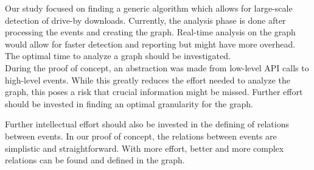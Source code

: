 Our study focused on finding a generic algorithm which allows for large-scale detection of drive-by downloads. Currently, the analysis phase is done after processing the events and creating the graph. Real-time analysis on the graph would allow for faster detection and reporting but might have more overhead. The optimal time to analyze a graph should be investigated.\\

During the proof of concept, an abstraction was made from low-level API calls to high-level events. While this greatly reduces the effort needed to analyze the graph, this poses a risk that crucial information might be missed. Further effort should be invested in finding an optimal granularity for the graph.

Further intellectual effort should also be invested in the defining of relations between events. In our proof of concept, the relations between events are simplistic and straightforward. With more effort, better and more complex relations can be found and defined in the graph.

